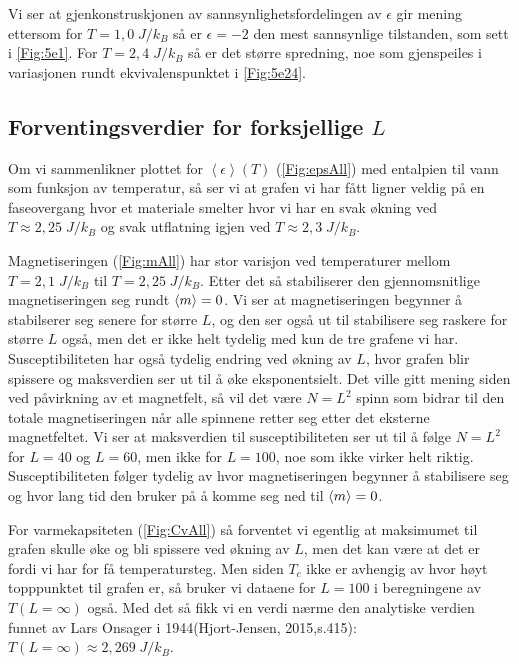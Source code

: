 \documentclass[reprint,english,notitlepage]{revtex4-2}  %
\begin{document}
Vi ser at gjenkonstruskjonen av sannsynlighetsfordelingen av $\epsilon$ gir mening ettersom for $T = 1,0 \; J/k_B$ så er $\epsilon = -2$ den mest sannsynlige tilstanden, som sett i \autoref{Fig:5e1}. For $T = 2,4 \; J/k_B$ så er det større spredning, noe som gjenspeiles i variasjonen rundt ekvivalenspunktet i \autoref{Fig:5e24}.

\subsection*{Forventingsverdier for forksjellige $L$}

Om vi sammenlikner plottet for $\left < \epsilon \right > (T)$ (\autoref{Fig:epsAll}) med entalpien til vann som funksjon av temperatur, så ser vi at grafen vi har fått ligner veldig på en faseovergang hvor et materiale smelter hvor vi har en svak økning ved $T \approx 2,25 \; J/k_B$ og svak utflatning igjen ved $T \approx 2,3 \; J/k_B$.

Magnetiseringen (\autoref{Fig:mAll}) har stor varisjon ved temperaturer mellom $T = 2,1 \; J/k_B$ til $T = 2,25 \; J/k_B$. Etter det så stabiliserer den gjennomsnitlige magnetiseringen seg rundt $ \expval{m} = 0$. Vi ser at magnetiseringen begynner å stabilserer seg senere for større $L$, og den ser også ut til stabilisere seg raskere for større $L$ også, men det er ikke helt tydelig med kun de tre grafene vi har. Susceptibiliteten har også tydelig endring ved økning av $L$, hvor grafen blir spissere og maksverdien ser ut til å øke eksponentsielt. Det ville gitt mening siden ved påvirkning av et magnetfelt, så vil det være $N = L^2$ spinn som bidrar til den totale magnetiseringen når alle spinnene retter seg etter det eksterne magnetfeltet. Vi ser at maksverdien til susceptibiliteten ser ut til å følge $N = L^2$ for $L = 40$ og $L = 60$, men ikke for $L = 100$, noe som ikke virker helt riktig. Susceptibiliteten følger tydelig av hvor magnetiseringen begynner å stabilisere seg og hvor lang tid den bruker på å komme seg ned til $\expval{m} = 0$.

For varmekapsiteten (\autoref{Fig:CvAll}) så forventet vi egentlig at maksimumet til grafen skulle øke og bli spissere ved økning av $L$, men det kan være at det er fordi vi har for få temperatursteg. Men siden  $T_c$ ikke er avhengig av hvor høyt topppunktet til grafen er, så bruker vi dataene for $L = 100$ i beregningene av $T \left ( L = \infty \right ) $ også. Med det så fikk vi en verdi nærme den analytiske verdien funnet av Lars Onsager i 1944(Hjort-Jensen, 2015,s.415): $T \left ( L = \infty \right ) \approx 2,269 \; J/k_B$.
\end{document}
